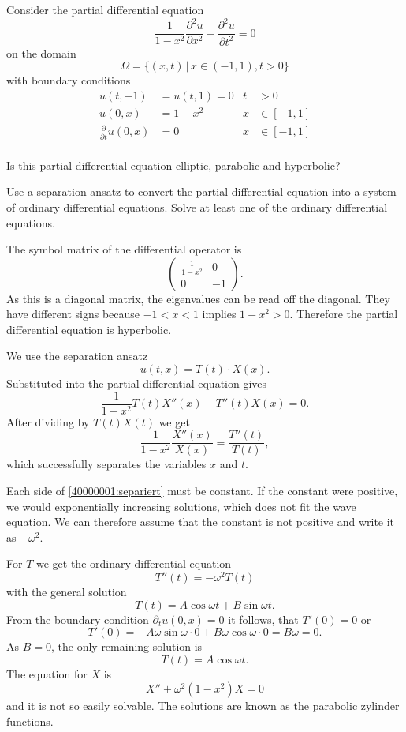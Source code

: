 Consider the partial differential equation
\[
\frac1{1-x^2}\frac{\partial^2 u}{\partial x^2}
-
\frac{\partial^2 u}{\partial t^2}=0
\]
on the domain
\[
\Omega=\{(x,t)\,|\, x\in (-1,1), t>0\}
\]
with boundary conditions
\begin{align*}
u(t,-1)&=u(t,1)=0&t&>0\\
u(0,x)&=1-x^2&x&\in[-1,1]\\
\frac{\partial}{\partial t}u(0,x)&=0&x&\in[-1,1]\\
\end{align*}
\begin{teilaufgaben}
\item
Is this partial differential equation elliptic, parabolic and hyperbolic?
\item
Use a separation ansatz to convert the partial differential equation
into a system of ordinary differential equations.
Solve at least one of the ordinary differential equations.
\end{teilaufgaben}

\begin{loesung}
\begin{teilaufgaben}
\item
The symbol matrix of the differential operator is
\[
\begin{pmatrix}
\frac1{1-x^2}&0\\0&-1
\end{pmatrix}.
\]
As this is a diagonal matrix, the eigenvalues can be read off the diagonal.
They have different signs because $-1<x<1$ implies $1-x^2 >0$.
Therefore the partial differential equation is hyperbolic.
\item
We use the separation ansatz
\[
u(t,x)=T(t)\cdot X(x).
\]
Substituted into the partial differential equation gives
\[
\frac1{1-x^2}T(t)X''(x)-T''(t)X(x)=0.
\]
After dividing by 
$T(t)X(t)$ we get
\begin{equation}
\frac1{1-x^2}\frac{X''(x)}{X(x)}=\frac{T''(t)}{T(t)},
\label{40000001:separiert}
\end{equation}
which successfully separates the variables $x$ and $t$.

Each side of \eqref{40000001:separiert} must be constant.
If the constant were positive, we would exponentially increasing
solutions, which does not fit the wave equation.
We can therefore assume that the constant is not positive
and write it as $-\omega^2$.

For $T$ we get the ordinary differential equation
\[
T''(t)=-\omega^2 T(t)
\]
with the general solution
\[
T(t)=A\cos\omega t+B\sin\omega t.
\]
From the boundary condition $\partial_t u(0,x)=0$ it follows, that
$T'(0)=0$ or
\[
T'(0)=-A\omega\sin\omega \cdot 0+B\omega\cos\omega\cdot 0=B\omega=0.
\]
As $B=0$, the only remaining solution is
\[
T(t)=A\cos\omega t.
\]
The equation for $X$ is
\[
X''+\omega^2(1-x^2)X=0
\]
and it is not so easily solvable.
The solutions are known as the parabolic zylinder functions. 
\qedhere
\end{teilaufgaben}
\end{loesung}

